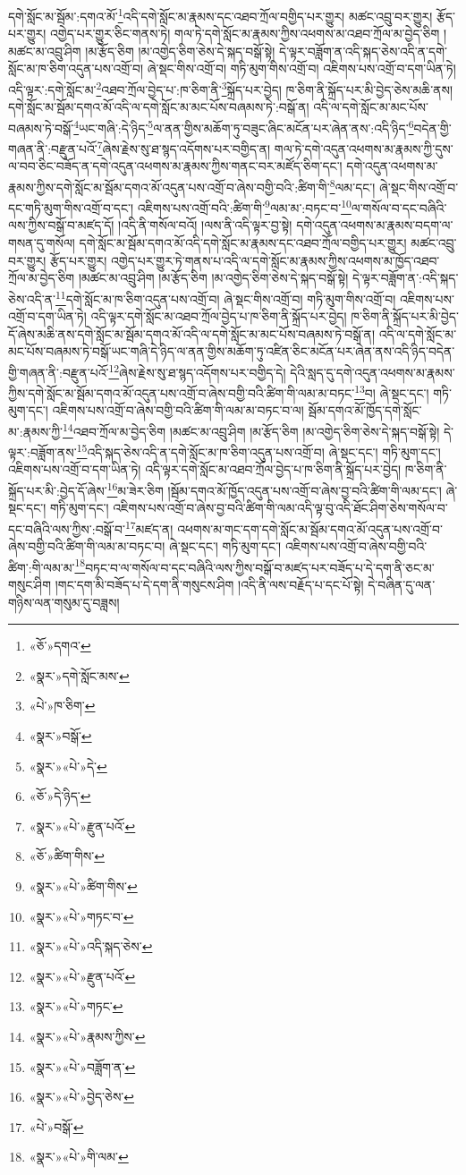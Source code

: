 དགེ་སློང་མ་སྦོམ་:དགའ་མོ་\footnote{«ཅོ་»དགའ་}འདི་དགེ་སློང་མ་རྣམས་དང་འཐབ་ཀྲོལ་བགྱིད་པར་གྱུར། མཚང་འབྲུ་བར་གྱུར། རྩོད་པར་གྱུར། འགྱེད་པར་གྱུར་ཅིང་གནས་ཏེ། གལ་ཏེ་དགེ་སློང་མ་རྣམས་ཀྱིས་འཕགས་མ་འཐབ་ཀྲོལ་མ་བྱེད་ཅིག །མཚང་མ་འབྲུ་ཤིག །མ་རྩོད་ཅིག །མ་འགྱེད་ཅིག་ཅེས་དེ་སྐད་བསྒོ་སྟེ། དེ་ལྟར་བཟློག་ན་འདི་སྐད་ཅེས་འདི་ན་དགེ་སློང་མ་ཁ་ཅིག་འདུན་པས་འགྲོ་བ། ཞེ་སྡང་གིས་འགྲོ་བ། གཏི་མུག་གིས་འགྲོ་བ། འཇིགས་པས་འགྲོ་བ་དག་ཡིན་ཏེ། འདི་ལྟར་:དགེ་སློང་མ་\footnote{«སྣར་»དགེ་སློང་མས་}འཐབ་ཀྲོལ་བྱེད་པ་:ཁ་ཅིག་ནི་\footnote{«པེ་»ཁ་ཅིག་}སྐྲོད་པར་བྱེད། ཁ་ཅིག་ནི་སྐྲོད་པར་མི་བྱེད་ཅེས་མཆི་ནས། དགེ་སློང་མ་སྦོམ་དགའ་མོ་འདི་ལ་དགེ་སློང་མ་མང་པོས་བཞམས་ཏེ་:བསྒོ་ན། འདི་ལ་དགེ་སློང་མ་མང་པོས་བཞམས་ཏེ་བསྒོ་\footnote{«སྣར་»བསྒོ་}ཡང་གཞི་:དེ་ཉིད་\footnote{«སྣར་»«པེ་»དེ་}ལ་ནན་གྱིས་མཆོག་ཏུ་བཟུང་ཞིང་མངོན་པར་ཞེན་ནས་:འདི་ཉིད་\footnote{«ཅོ་»དེ་ཉིད་}བདེན་གྱི་གཞན་ནི་:བརྫུན་པའོ་\footnote{«སྣར་»«པེ་»རྫུན་པའོ་}ཞེས་རྗེས་སུ་ཐ་སྙད་འདོགས་པར་བགྱིད་ན། གལ་ཏེ་དགེ་འདུན་འཕགས་མ་རྣམས་ཀྱི་དུས་ལ་བབ་ཅིང་བཟོད་ན་དགེ་འདུན་འཕགས་མ་རྣམས་ཀྱིས་གནང་བར་མཛོད་ཅིག་དང་། དགེ་འདུན་འཕགས་མ་རྣམས་ཀྱིས་དགེ་སློང་མ་སྦོམ་དགའ་མོ་འདུན་པས་འགྲོ་བ་ཞེས་བགྱི་བའི་:ཚིག་གི་\footnote{«ཅོ་»ཚིག་གིས་}ལམ་དང་། ཞེ་སྡང་གིས་འགྲོ་བ་དང་གཏི་མུག་གིས་འགྲོ་བ་དང་། འཇིགས་པས་འགྲོ་བའི་:ཚིག་གི་\footnote{«སྣར་»«པེ་»ཚིག་གིས་}ལམ་མ་:བཏང་བ་\footnote{«སྣར་»«པེ་»གཏང་བ་}ལ་གསོལ་བ་དང་བཞིའི་ལས་ཀྱིས་བསྒོ་བ་མཛད་དོ། །འདི་ནི་གསོལ་བའོ། །ལས་ནི་འདི་ལྟར་བྱ་སྟེ། དགེ་འདུན་འཕགས་མ་རྣམས་བདག་ལ་གསན་དུ་གསོལ། དགེ་སློང་མ་སྦོམ་དགའ་མོ་འདི་དགེ་སློང་མ་རྣམས་དང་འཐབ་ཀྲོལ་བགྱིད་པར་གྱུར། མཚང་འབྲུ་བར་གྱུར། རྩོད་པར་གྱུར། འགྱེད་པར་གྱུར་ཏེ་གནས་པ་འདི་ལ་དགེ་སློང་མ་རྣམས་ཀྱིས་འཕགས་མ་ཁྱོད་འཐབ་ཀྲོལ་མ་བྱེད་ཅིག །མཚང་མ་འབྲུ་ཤིག །མ་རྩོད་ཅིག །མ་འགྱེད་ཅིག་ཅེས་དེ་སྐད་བསྒོ་སྟེ། དེ་ལྟར་བཟློག་ན་:འདི་སྐད་ཅེས་འདི་ན་\footnote{«སྣར་»«པེ་»འདི་སྐད་ཅེས་}དགེ་སློང་མ་ཁ་ཅིག་འདུན་པས་འགྲོ་བ། ཞེ་སྡང་གིས་འགྲོ་བ། གཏི་མུག་གིས་འགྲོ་བ། འཇིགས་པས་འགྲོ་བ་དག་ཡིན་ཏེ། འདི་ལྟར་དགེ་སློང་མ་འཐབ་ཀྲོལ་བྱེད་པ་ཁ་ཅིག་ནི་སྐྲོད་པར་བྱེད། ཁ་ཅིག་ནི་སྐྲོད་པར་མི་བྱེད་དོ་ཞེས་མཆི་ནས་དགེ་སློང་མ་སྦོམ་དགའ་མོ་འདི་ལ་དགེ་སློང་མ་མང་པོས་བཞམས་ཏེ་བསྒོ་ན། འདི་ལ་དགེ་སློང་མ་མང་པོས་བཞམས་ཏེ་བསྒོ་ཡང་གཞི་དེ་ཉིད་ལ་ནན་གྱིས་མཆོག་ཏུ་འཛིན་ཅིང་མངོན་པར་ཞེན་ནས་འདི་ཉིད་བདེན་གྱི་གཞན་ནི་:བརྫུན་པའོ་\footnote{«སྣར་»«པེ་»རྫུན་པའོ་}ཞེས་རྗེས་སུ་ཐ་སྙད་འདོགས་པར་བགྱིད་དེ། དེའི་སླད་དུ་དགེ་འདུན་འཕགས་མ་རྣམས་ཀྱིས་དགེ་སློང་མ་སྦོམ་དགའ་མོ་འདུན་པས་འགྲོ་བ་ཞེས་བགྱི་བའི་ཚིག་གི་ལམ་མ་བཏང་\footnote{«སྣར་»«པེ་»གཏང་}བ། ཞེ་སྡང་དང་། གཏི་མུག་དང་། འཇིགས་པས་འགྲོ་བ་ཞེས་བགྱི་བའི་ཚིག་གི་ལམ་མ་བཏང་བ་ལ། སྦོམ་དགའ་མོ་ཁྱོད་དགེ་སློང་མ་:རྣམས་ཀྱི་\footnote{«སྣར་»«པེ་»རྣམས་ཀྱིས་}འཐབ་ཀྲོལ་མ་བྱེད་ཅིག །མཚང་མ་འབྲུ་ཤིག །མ་རྩོད་ཅིག །མ་འགྱེད་ཅིག་ཅེས་དེ་སྐད་བསྒོ་སྟེ། དེ་ལྟར་:བཟློག་ནས་\footnote{«སྣར་»«པེ་»བཟློག་ན་}འདི་སྐད་ཅེས་འདི་ན་དགེ་སློང་མ་ཁ་ཅིག་འདུན་པས་འགྲོ་བ། ཞེ་སྡང་དང་། གཏི་མུག་དང་། འཇིགས་པས་འགྲོ་བ་དག་ཡིན་ཏེ། འདི་ལྟར་དགེ་སློང་མ་འཐབ་ཀྲོལ་བྱེད་པ་ཁ་ཅིག་ནི་སྐྲོད་པར་བྱེད། ཁ་ཅིག་ནི་སྐྲོད་པར་མི་:བྱེད་དོ་ཞེས་\footnote{«སྣར་»«པེ་»བྱེད་ཅེས་}མ་ཟེར་ཅིག །སྦོམ་དགའ་མོ་ཁྱོད་འདུན་པས་འགྲོ་བ་ཞེས་བྱ་བའི་ཚིག་གི་ལམ་དང་། ཞེ་སྡང་དང་། གཏི་མུག་དང་། འཇིགས་པས་འགྲོ་བ་ཞེས་བྱ་བའི་ཚིག་གི་ལམ་འདི་ལྟ་བུ་འདི་ཐོང་ཤིག་ཅེས་གསོལ་བ་དང་བཞིའི་ལས་ཀྱིས་:བསྒོ་བ་\footnote{«པེ་»བསྒོ་}མཛད་ན། འཕགས་མ་གང་དག་དགེ་སློང་མ་སྦོམ་དགའ་མོ་འདུན་པས་འགྲོ་བ་ཞེས་བགྱི་བའི་ཚིག་གི་ལམ་མ་བཏང་བ། ཞེ་སྡང་དང་། གཏི་མུག་དང་། འཇིགས་པས་འགྲོ་བ་ཞེས་བགྱི་བའི་ཚིག་:གི་ལམ་མ་\footnote{«སྣར་»«པེ་»གི་ལམ་}བཏང་བ་ལ་གསོལ་བ་དང་བཞིའི་ལས་ཀྱིས་བསྒོ་བ་མཛད་པར་བཟོད་པ་དེ་དག་ནི་ཅང་མ་གསུང་ཤིག །གང་དག་མི་བཟོད་པ་དེ་དག་ནི་གསུངས་ཤིག །འདི་ནི་ལས་བརྗོད་པ་དང་པོ་སྟེ། དེ་བཞིན་དུ་ལན་གཉིས་ལན་གསུམ་དུ་བཟླས། 